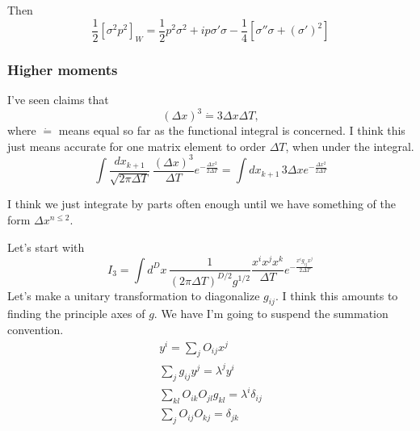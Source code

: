 Then 
\begin{equation}
\boxed{\frac{1}{2}[\sigma^2p^2]_W = \frac{1}{2}p^2\sigma^2 + ip\sigma'\sigma -\frac{1}{4}[\sigma''\sigma + (\sigma')^2]}
\end{equation}


\subsubsection{Higher moments}
I've seen claims that 
\begin{equation}
(\Delta x)^3 \dot{=} 3\Delta x \Delta T,
\end{equation}
where $\dot{=}$ means equal so far as the functional integral is concerned.
 I think this just means accurate for one matrix element to order $\Delta T$, when under the integral.  
\begin{equation}
\int \frac{dx_{k+1}}{\sqrt{2\pi\Delta T}}\, \frac{(\Delta x)^3}{\Delta T} e^{-\frac{\Delta x^2}{2\Delta T}} = \int dx_{k+1}\,3\Delta x e^{-\frac{\Delta x^2}{2\Delta T}}
\end{equation}



I think we just integrate by parts often enough until we have something of the form $\Delta x^{n\le 2}$.  

Let's start with 
\begin{equation}
I_3 = \int d^D x\, \frac{1}{(2\pi \Delta T)^{D/2}g^{1/2}} \frac{x^ix^jx^k}{\Delta T} e^{-\frac{x^ig_{ij}x^j}{2\Delta T}}
\end{equation}
Let's make a unitary transformation to diagonalize $g_{ij}$.  I think this amounts to finding the principle axes of $g$.  We have I'm going to suspend the summation convention.  
\begin{gather}
y^i = \sum_jO_{ij}x^j\\
\sum_jg_{ij}y^j = \lambda^j y^i\\
\sum_{kl}O_{ik}O_{jl}g_{kl} = \lambda^i\delta_{ij}\\
\sum_j O_{ij}O_{kj} = \delta_{jk}
\end{gather}

